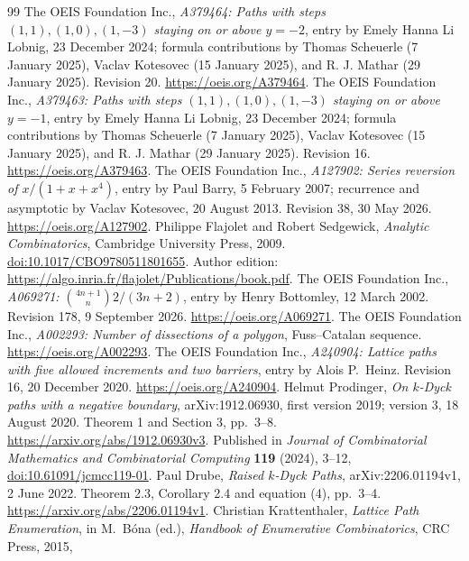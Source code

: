 \documentclass[11pt]{article}
\begin{document}
\begin{thebibliography}{99}\small
{} The OEIS Foundation Inc.,
\emph{A379464: Paths with steps $(1,1),(1,0),(1,-3)$ staying on or above $y=-2$},
entry by Emely Hanna Li Lobnig, 23 December 2024;
formula contributions by Thomas Scheuerle (7 January 2025),
Vaclav Kotesovec (15 January 2025), and R. J. Mathar (29 January 2025).
Revision 20. \url{https://oeis.org/A379464}.
 The OEIS Foundation Inc.,
\emph{A379463: Paths with steps $(1,1),(1,0),(1,-3)$ staying on or above $y=-1$},
entry by Emely Hanna Li Lobnig, 23 December 2024;
formula contributions by Thomas Scheuerle (7 January 2025),
Vaclav Kotesovec (15 January 2025), and R. J. Mathar (29 January 2025).
Revision 16. \url{https://oeis.org/A379463}.
 The OEIS Foundation Inc.,
\emph{A127902: Series reversion of $x/(1+x+x^4)$},
entry by Paul Barry, 5 February 2007; recurrence and asymptotic
by Vaclav Kotesovec, 20 August 2013. Revision 38, 30 May 2026.
\url{https://oeis.org/A127902}.
 Philippe Flajolet and Robert Sedgewick,
\emph{Analytic Combinatorics}, Cambridge University Press, 2009.
\href{https://doi.org/10.1017/CBO9780511801655}{doi:10.1017/CBO9780511801655}.
Author edition: \url{https://algo.inria.fr/flajolet/Publications/book.pdf}.
 The OEIS Foundation Inc.,
\emph{A069271: $\binom{4n+1}{n}2/(3n+2)$}, entry by Henry Bottomley,
12 March 2002. Revision 178, 9 September 2026.
\url{https://oeis.org/A069271}.
 The OEIS Foundation Inc.,
\emph{A002293: Number of dissections of a polygon}, Fuss--Catalan sequence.
\url{https://oeis.org/A002293}.
 The OEIS Foundation Inc.,
\emph{A240904: Lattice paths with five allowed increments and two barriers},
entry by Alois P.\ Heinz. Revision 16, 20 December 2020.
\url{https://oeis.org/A240904}.
 Helmut Prodinger,
\emph{On $k$-Dyck paths with a negative boundary},
arXiv:1912.06930, first version 2019; version 3, 18 August 2020.
Theorem 1 and Section 3, pp.\ 3--8.
\url{https://arxiv.org/abs/1912.06930v3}.
Published in \emph{Journal of Combinatorial Mathematics and Combinatorial
Computing} \textbf{119} (2024), 3--12,
\href{https://doi.org/10.61091/jcmcc119-01}{doi:10.61091/jcmcc119-01}.
 Paul Drube,
\emph{Raised $k$-Dyck Paths}, arXiv:2206.01194v1, 2 June 2022.
Theorem 2.3, Corollary 2.4 and equation (4), pp.\ 3--4.
\url{https://arxiv.org/abs/2206.01194v1}.
 Christian Krattenthaler,
\emph{Lattice Path Enumeration}, in M.\ B\'ona (ed.),
\emph{Handbook of Enumerative Combinatorics}, CRC Press, 2015,

\end{thebibliography}
\end{document}
